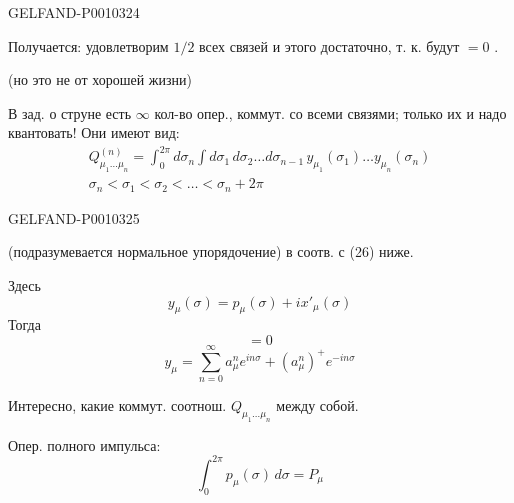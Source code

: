 \begin{GelfandAdjacentEvidence}{GELFAND-P001032}{4}

Получается: удовлетворим $1/2$ всех связей и этого достаточно, т. к. будут $=0$ .

(но это не от хорошей жизни)

В зад. о струне есть $\infty$ кол-во опер., коммут. со всеми связями; только их и надо квантовать! Они имеют вид:
\begin{equation*}
\begin{gathered}
Q_{\mu_1\ldots\mu_n}^{(n)}=
\int_0^{2\pi}d\sigma_n\int d\sigma_1\,d\sigma_2\ldots d\sigma_{n-1}
\,y_{\mu_1}(\sigma_1)\ldots y_{\mu_n}(\sigma_n)\\
\sigma_n<\sigma_1<\sigma_2<\ldots<\sigma_n+2\pi
\end{gathered}
\tag{24}
\end{equation*}
\end{GelfandAdjacentEvidence}
\begin{GelfandAdjacentEvidence}{GELFAND-P001032}{5}

\end{GelfandAdjacentEvidence}


(подразумевается нормальное упорядочение) в соотв. с (26) ниже.

Здесь
\[
y_\mu(\sigma)=p_\mu(\sigma)+i x'_\mu(\sigma)
\]
Тогда
\begin{equation*}
[Q,L_n]=0
\tag{25}
\end{equation*}
\begin{equation*}
y_\mu=\sum_{n=0}^{\infty}a_\mu^n e^{in\sigma}
+(a_\mu^n)^+e^{-in\sigma}
\tag{26}
\end{equation*}

Интересно, какие коммут. соотнош. $Q_{\mu_1\ldots\mu_n}$ между собой.

Опер. полного импульса:
\begin{equation*}
\int_0^{2\pi}p_\mu(\sigma)\,d\sigma=P_\mu
\tag{27}
\end{equation*}


